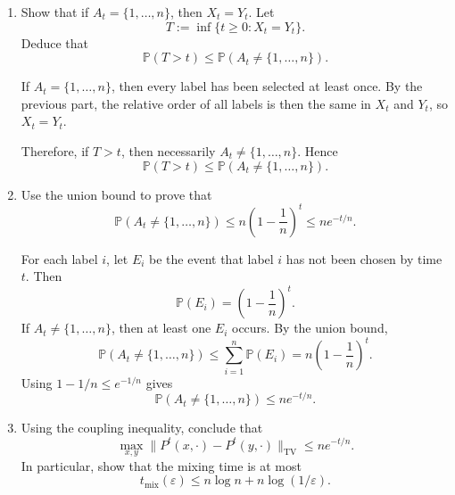 \documentclass[answers,12pt,addpoints]{exam}
\newcommand{\TV}{\mathrm{TV}}
\begin{document}
\begin{enumerate}
\begin{solution}
\medskip\noindent
\textit{Case 2: $i_{t+1} \notin A_t$.}
Then $A_{t+1} = A_t \cup \{i_{t+1}\}$, and in both decks the new label
$i_{t+1}$ is moved to the top of the deck. In particular, $i_{t+1}$ is
placed above all labels in $A_t$ in both $X_{t+1}$ and $Y_{t+1}$, while
the relative order of the labels in $A_t$ among themselves is unchanged.
Thus the relative order of the labels in $A_{t+1}$ is the same in
$X_{t+1}$ and $Y_{t+1}$.

\medskip

In either case, the relative order of the labels in $A_{t+1}$ is the
same in the two decks. By induction, the claim holds for all $t$. \qedhere
\end{solution}

  \item Show that if $A_t = \{1,\dots,n\}$, then $X_t = Y_t$. Let
  \[
  T := \inf\{t \ge 0 : X_t = Y_t\}.
  \]
  Deduce that
  \[
  \mathbb{P}(T > t) \le \mathbb{P}(A_t \neq \{1,\dots,n\}).
  \]

  \begin{solution}
  If $A_t=\{1,\dots,n\}$, then every label has been selected at least once. By the previous part, the relative order of all labels is then the same in $X_t$ and $Y_t$, so $X_t=Y_t$.

  Therefore, if $T>t$, then necessarily $A_t\neq \{1,\dots,n\}$. Hence
  \[
  \mathbb{P}(T>t) \le \mathbb{P}(A_t\neq \{1,\dots,n\}).
  \]
  \end{solution}

  \item Use the union bound to prove that
  \[
  \mathbb{P}(A_t \neq \{1,\dots,n\})
  \le n\left(1 - \frac{1}{n}\right)^t
  \le ne^{-t/n}.
  \]

  \begin{solution}
  For each label $i$, let $E_i$ be the event that label $i$ has not been chosen by time $t$. Then
  \[
  \mathbb{P}(E_i)=\left(1-\frac{1}{n}\right)^t.
  \]
  If $A_t\neq\{1,\dots,n\}$, then at least one $E_i$ occurs. By the union bound,
  \[
  \mathbb{P}(A_t\neq\{1,\dots,n\}) \le \sum_{i=1}^n \mathbb{P}(E_i)
  = n\left(1-\frac{1}{n}\right)^t.
  \]
  Using $1-1/n \le e^{-1/n}$ gives
  \[
  \mathbb{P}(A_t\neq\{1,\dots,n\}) \le ne^{-t/n}.
  \]
  \end{solution}

  \item Using the coupling inequality, conclude that
  \[
  \max_{x,y} \|P^t(x,\cdot) - P^t(y,\cdot)\|_{\TV}
  \le ne^{-t/n}.
  \]
  In particular, show that the mixing time is at most
  \[
  t_{\mathrm{mix}}(\varepsilon) \le n \log n + n \log(1/\varepsilon).
  \]


\end{enumerate}
\end{document}
